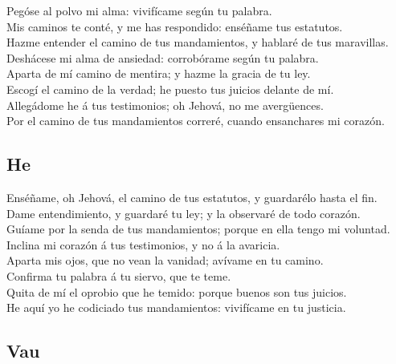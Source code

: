  Pegóse al polvo mi alma: vivifícame según tu palabra.\\
 Mis caminos te conté, y me has respondido: enséñame tus
estatutos.\\
 Hazme entender el camino de tus mandamientos, y hablaré de
tus maravillas.\\
 Deshácese mi alma de ansiedad: corrobórame según tu
palabra.\\
 Aparta de mí camino de mentira; y hazme la gracia de tu
ley.\\
 Escogí el camino de la verdad; he puesto tus juicios
delante de mí.\\
 Allegádome he á tus testimonios; oh Jehová, no me
avergüences.\\
 Por el camino de tus mandamientos correré, cuando
ensanchares mi corazón.

\hypertarget{he}{%
\subsection{He}\label{he}}

 Enséñame, oh Jehová, el camino de tus estatutos, y
guardarélo hasta el fin.\\
 Dame entendimiento, y guardaré tu ley; y la observaré de
todo corazón.\\
 Guíame por la senda de tus mandamientos; porque en ella
tengo mi voluntad.\\
 Inclina mi corazón á tus testimonios, y no á la
avaricia.\\
 Aparta mis ojos, que no vean la vanidad; avívame en tu
camino.\\
 Confirma tu palabra á tu siervo, que te teme.\\
 Quita de mí el oprobio que he temido: porque buenos son
tus juicios.\\
 He aquí yo he codiciado tus mandamientos: vivifícame en tu
justicia.

\hypertarget{vau}{%
\subsection{Vau}\label{vau}}


